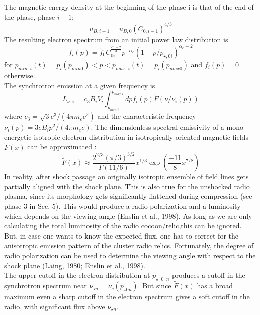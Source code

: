 \documentclass[11pt]{report}
\newcommand{\cc}[1]{\left({#1}\right)}
\begin{document}
The magnetic energy density at the beginning of the phase i is that of the end of the phase, phase $i-1$:
\begin{equation}
u_{B,i-1}=u_{B,0}(C_{0,i-1})^{4/3}
\end{equation}
The resulting electron spectrum from an initial power law distribution is 
\begin{equation}
f_i(p)=\tilde{f_0}C^{\frac{\alpha_e+2}{3}}_{0i} p^{-\alpha_e}(1-p/p_{\star,0i})^{\alpha_e-2}
\end{equation}
for $p_{min\;\;i}(t)=p_i(p_{min0})<p<p_{max\;\;i}(t)=p_i(p_{max0})$ and $f_i(p)=0$ otherwise.\\
The synchrotron emission at a given frequency is 
\begin{equation}
L_{\nu\;\;i}=c_3B_i V_i \int^{p_{max\;i}} _{p_{min \; i}} dpf_i(p) \tilde{F}(\nu/\nu_i(p))
\end{equation}
where $c_3=\sqrt{3}e^3/(4 \pi m_e c^2)$ and the characteristic frequency $\nu_i(p)=3eB_ip^2/(4 \pi m_e c)$. The dimensionless spectral emissivity of a mono-energetic isotropic electron distribution in isotropically oriented magnetic fields $\tilde{F}(x)$ can be approximated :
\begin{equation}
\tilde{F}(x)\approx \frac{2^{2/3}(\pi/3)^{3/2}}{\Gamma(11/6)}x^{1/3}\exp\cc{\frac{-11}{8}x^{7/8}}
\end{equation}
In reality, after shock passage an originally isotropic ensemble of field lines gets partially aligned with the shock plane. This is also true for the unshocked radio plasma, since its morphology gets significantly flattened during compression (see phase 3 in Sec. 5). This would produce a radio polarization and a luminosity which depends on the viewing angle (Enslin et al., 1998). As long as we are only calculating the total luminosity of the radio cocoon/relic,this can be ignored. But, in case one wants to know the expected flux, one has to correct for the anisotropic emission pattern of the cluster radio relics. Fortunately, the degree of radio polarization can be used to determine the viewing angle with respect to the shock plane (Laing, 1980; Enslin et al., 1998).\\
The upper cutoff in the electron distribution at $p_{\star \;\; 0 \; \;n}$ produces a cutoff in the synchrotron spectrum near $\nu_{\star n} = \nu_c(p_{\star 0n})$. But since $\tilde{F}(x)$  has a broad maximum even a sharp cutoff in the electron spectrum gives a soft cutoff in the radio, with significant flux above $\nu_{\star n}$.
\end{document}
